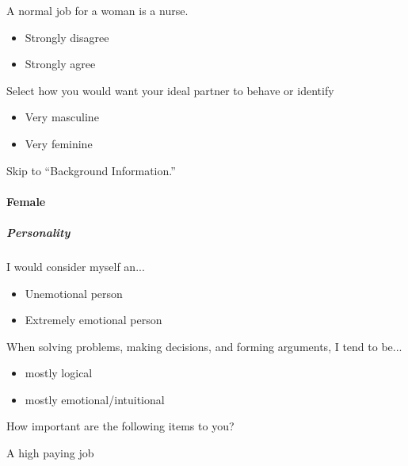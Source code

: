\documentclass[twoside]{report}
\begin{document}
\begin{multicols*}{2}
\begin{multicols}{2}
A normal job for a woman is a nurse.

\begin{itemize}
\item
  Strongly disagree
\end{itemize}

\begin{itemize}
\item
  Strongly agree
\end{itemize}

Select how you would want your ideal partner to behave or identify

\begin{itemize}
\item
  Very masculine
\end{itemize}

\begin{itemize}
\item
  Very feminine
\end{itemize}

Skip to ``Background Information.''

\paragraph{Female}

\subparagraph{Personality}

I would consider myself an...

\begin{itemize}
\item
  Unemotional person
\end{itemize}

\begin{itemize}
\item
  Extremely emotional person
\end{itemize}

When solving problems, making decisions, and forming arguments, I tend
to be...

\begin{itemize}
\item
  mostly logical
\end{itemize}

\begin{itemize}
\item
  mostly emotional/intuitional
\end{itemize}

How important are the following items to you?

A high paying job


\end{multicols}
\end{multicols*}
\end{document}
